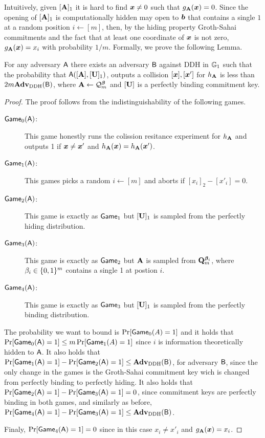Intuitively, given $[\mathbf{{A}}]_1$ it is hard to find ${\boldsymbol{x}}\neq 0$ such that $g_{\mathbf{{A}}}({\boldsymbol{x}})=0$. Since the opening of $[\mathbf{{A}}]_1$ is computationally hidden  may open to ${\boldsymbol{b}}$ that contains a single $1$ at a random position $i\gets[m]$, then, by the hiding property Groth-Sahai commitments and the fact that at least one coordinate of ${\boldsymbol{x}}$ is not zero, $g_{\mathbf{{A}}}({\boldsymbol{x}}) = x_i$ with probability $1/m$. Formally, we prove the following Lemma.
\begin{lemma}
For any adversary $\mathsf{A}$ there exists an adversary $\mathsf{B}$ against DDH in $\mathbb{G}_1$ such that the probability that $\mathsf{A}([\mathbf{{A}}],[\mathbf{{U}}]_1)$, outputs a collision $[{\boldsymbol{x}}],[{\boldsymbol{x}}']$ for $h_{\mathbf{{A}}}$  is less than $2m \mathbf{Adv}_{\mathrm{DDH}}(\mathsf{B})$, where $\mathbf{{A}}\gets\mathcal{Q}^{\boldsymbol{\beta}}_m$ and $[\mathbf{{U}}]$ is a perfectly binding commitment key.
\end{lemma}
\begin{proof}
The proof follows from the indistinguishability of the following games.
\begin{description}
\item[$\mathsf{Game}_0(\mathsf{A})$:] This game honestly runs the colission resitance experiment for $h_{\mathbf{{A}}}$ and outputs 1 if ${\boldsymbol{x}}\neq{\boldsymbol{x}}'$ and $h_{\mathbf{{A}}}({\boldsymbol{x}})=h_{\mathbf{{A}}}({\boldsymbol{x}}')$.
\item[$\mathsf{Game}_1(\mathsf{A})$:] This games picks a random $i\gets[m]$ and aborts if $[x_i]_2-[x'_i]=0.$
\item[$\mathsf{Game}_2(\mathsf{A})$:] This game is exactly as $\mathsf{Game}_1$ but $[\mathbf{{U}}]_1$ is sampled from the perfectly hiding distribution.
\item[$\mathsf{Game}_3(\mathsf{A})$:] This game is exactly as $\mathsf{Game}_2$ but $\mathbf{{A}}$ is sampled from $\mathbf{{Q}}_m^{{\boldsymbol{\beta}}_i}$, where $\beta_i\in\{0,1\}^m$ contains a single 1 at postion $i$.
\item[$\mathsf{Game}_4(\mathsf{A})$:] This game is exactly as $\mathsf{Game}_3$ but $[\mathbf{{U}}]_1$ is sampled from the perfectly binding distribution.
\end{description}
The probability we want to bound is $\Pr[\mathsf{Game}_0(A)=1]$ and it holds that $\Pr[\mathsf{Game}_0(\mathsf{A})=1]\leq m\Pr[\mathsf{Game}_1(A)=1]$ since $i$ is information theoretically hidden to $\mathsf{A}$. It also holds that $\Pr[\mathsf{Game}_1(\mathsf{A})=1]-\Pr[\mathsf{Game}_2(\mathsf{A})=1]\leq\mathbf{Adv}_\mathrm{DDH}(\mathsf{B})$, for adversary $\mathsf{B}$, since the only change in the games is the Groth-Sahai commitment key wich is changed from perfectly binding to perfectly hiding.
It also holds that $\Pr[\mathsf{Game}_2(\mathsf{A})=1]-\Pr[\mathsf{Game}_3(\mathsf{A})=1]=0$, since commitment keys are perfectly binding in both games, and similarly as before, $\Pr[\mathsf{Game}_4(\mathsf{A})=1]-\Pr[\mathsf{Game}_3(\mathsf{A})=1]\leq\mathbf{Adv}_\mathrm{DDH}(\mathsf{B})$.

Finaly, $\Pr[\mathsf{Game}_4(\mathsf{A})=1]=0$ since in this case $x_i \neq x'_i$ and $g_{\mathbf{{A}}}({\boldsymbol{x}}) = x_i$.
\end{proof}

